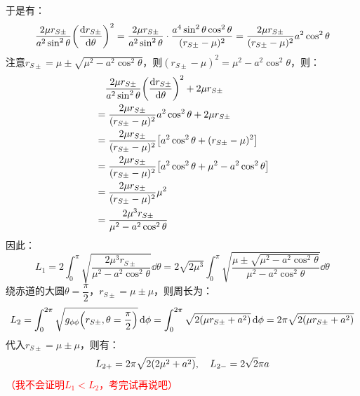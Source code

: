 \documentclass[a4paper]{article}
\begin{document}
\begin{enumerate}
\begin{itemize}
        于是有：
        \[
            \frac{2\mu r_{S\pm}}{a^2 \sin^2{\theta}} \qty(\dv{r_{S\pm}}{\theta})^2
            = \frac{2\mu r_{S\pm}}{a^2 \sin^2{\theta}} \cdot \frac{a^4 \sin^2{\theta} \cos^2{\theta}}{(r_{S\pm} - \mu)^2}
            = \frac{2\mu r_{S\pm}}{(r_{S\pm} - \mu)^2} a^2 \cos^2{\theta}
        \]
        注意$r_{S\pm} = \mu \pm \sqrt{\mu^2 - a^2\cos^2\theta}$，则$(r_{S\pm} - \mu)^2 = \mu^2 - a^2\cos^2\theta$，则：
        \begin{align*}
            &\quad \frac{2\mu r_{S\pm}}{a^2 \sin^2{\theta}} \qty(\dv{r_{S\pm}}{\theta})^2 + 2\mu r_{S\pm} \\
            &= \frac{2\mu r_{S\pm}}{(r_{S\pm} - \mu)^2} a^2 \cos^2{\theta} + 2\mu r_{S\pm} \\
            &= \frac{2\mu r_{S\pm}}{(r_{S\pm} - \mu)^2} \qty[a^2 \cos^2{\theta} + (r_{S\pm} - \mu)^2] \\
            &= \frac{2\mu r_{S\pm}}{(r_{S\pm} - \mu)^2} \qty[a^2 \cos^2{\theta} + \mu^2 - a^2 \cos^2{\theta}] \\
            &= \frac{2\mu r_{S\pm}}{(r_{S\pm} - \mu)^2} \mu^2 \\
            &= \frac{2\mu^3 r_{S\pm}}{\mu^2 - a^2\cos^2\theta}
        \end{align*}
        因此：
        \[
            L_1 = 2\int_0^\pi \sqrt{\frac{2\mu^3 r_{S\pm}}{\mu^2 - a^2\cos^2\theta}} \dd{\theta} = 2\sqrt{2\mu^3} \int_0^\pi \sqrt{\frac{\mu \pm \sqrt{\mu^2 - a^2\cos^2\theta}}{\mu^2 - a^2\cos^2\theta}} \dd{\theta}
        \]
        绕赤道的大圆$\theta = \dfrac{\pi}{2}$，$r_{S\pm} = \mu \pm \mu$，则周长为：
        \[
            L_2 = \int_0^{2\pi} \sqrt{g_{\phi\phi}\qty(r_{S\pm}, \theta=\frac{\pi}{2})} \dd{\phi} = \int_0^{2\pi} \sqrt{2\qty(\mu r_{S\pm} + a^2)} \dd{\phi} = 2\pi \sqrt{2\qty(\mu r_{S\pm} + a^2)}
        \]
        代入$r_{S\pm} = \mu \pm \mu$，则有：
        \[
            L_{2+} = 2\pi \sqrt{2\qty(2\mu^2 + a^2)},\quad L_{2-} = 2\sqrt{2}\pi a
        \]
        \textcolor{red}{（我不会证明$L_1 < L_2$，考完试再说吧）}
    \end{itemize}


\end{enumerate}
\end{document}
